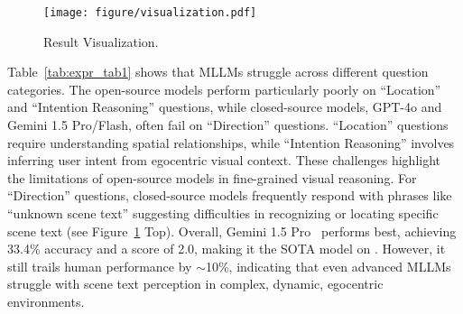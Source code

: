 
\begin{figure}[t!]
\centering
\texttt{[image: figure/visualization.pdf]}
\vspace{-0.2in}
\caption{Result Visualization.} 
\vspace{-0.6cm}
\label{fig:vis}
\end{figure}


\noindent\textbf{\datasetout} 
Table~\ref{tab:expr_tab1} shows that MLLMs struggle across different question categories. The open-source models perform particularly poorly on “Location” and “Intention Reasoning” questions, while closed-source models, GPT-4o and Gemini 1.5 Pro/Flash, often fail on “Direction” questions. “Location” questions require understanding spatial relationships, while “Intention Reasoning” involves inferring user intent from egocentric visual context. These challenges highlight the limitations of open-source models in fine-grained visual reasoning. For “Direction” questions, closed-source models frequently respond with phrases like “unknown scene text” suggesting difficulties in recognizing or locating specific scene text (see Figure~\ref{fig:vis} Top). Overall, Gemini 1.5 Pro~\cite{reid2024gemini} performs best, achieving 33.4\% accuracy and a score of 2.0, making it the SOTA model on \datasetout. However, it still trails human performance by $\sim$10\%, indicating that even advanced MLLMs struggle with scene text perception in complex, dynamic, egocentric environments.

